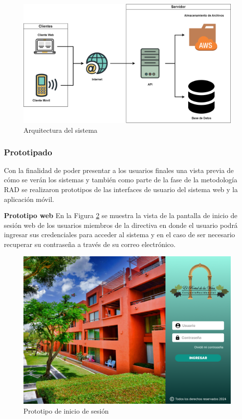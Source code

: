 \begin{figure}[H]
    \centering
    \includegraphics[width=1\textwidth]{resources/images/Arquitectura}
    \caption{Arquitectura del sistema}
    \label{fig:arquitectura}
\end{figure}

\subsubsection{Prototipado}

Con la finalidad de poder presentar a los usuarios finales una vista previa de cómo se verán los sistemas y también como parte de la fase de la metodología RAD se realizaron prototipos de las interfaces de usuario del sistema web y la aplicación móvil.
\bigbreak

\textbf{Prototipo web}
\bigbreak
En la Figura \ref{fig:login} se muestra la vista de la pantalla de inicio de sesión web de los usuarios miembros de la directiva en donde el usuario podrá ingresar sus credenciales para acceder al sistema y en el caso de ser necesario recuperar su contraseña a través de su correo electrónico.

\begin{figure}[H]
    \centering
    \includegraphics[width=1\textwidth]{resources/images/login}
    \caption{Prototipo de inicio de sesión}
    \label{fig:login}
\end{figure}

